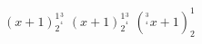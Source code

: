 \startTEXpage [offset=1dk]
    $ \left( x + 1 \right )^1_2^^3__4 $
    \blank
    $ ( x + 1 )^1_2^^3__4 $
    \blank
    $ (^^3__4 x + 1 )^1_2 $
\stopTEXpage
